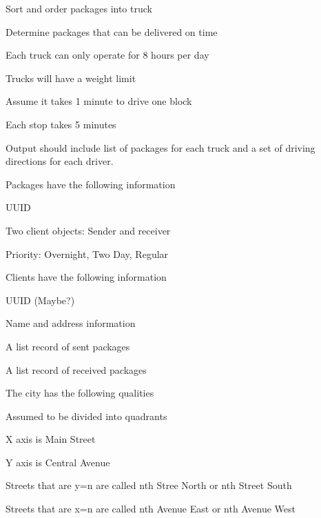 \begin{DoxyItemize}
\item Sort and order packages into truck
\item Determine packages that can be delivered on time
\begin{DoxyItemize}
\item Each truck can only operate for 8 hours per day
\item Trucks will have a weight limit
\item Assume it takes 1 minute to drive one block
\item Each stop takes 5 minutes
\end{DoxyItemize}
\item Output should include list of packages for each truck and a set of driving directions for each driver.
\item Packages have the following information
\begin{DoxyItemize}
\item U\+U\+ID
\item Two client objects\+: Sender and receiver
\item Priority\+: Overnight, Two Day, Regular
\end{DoxyItemize}
\item Clients have the following information
\begin{DoxyItemize}
\item U\+U\+ID (Maybe?)
\item Name and address information
\item A list record of sent packages
\item A list record of received packages
\end{DoxyItemize}
\item The city has the following qualities
\begin{DoxyItemize}
\item Assumed to be divided into quadrants
\item X axis is Main Street
\item Y axis is Central Avenue
\item Streets that are y=n are called nth Stree North or nth Street South
\item Streets that are x=n are called nth Avenue East or nth Avenue West 
\end{DoxyItemize}
\end{DoxyItemize}